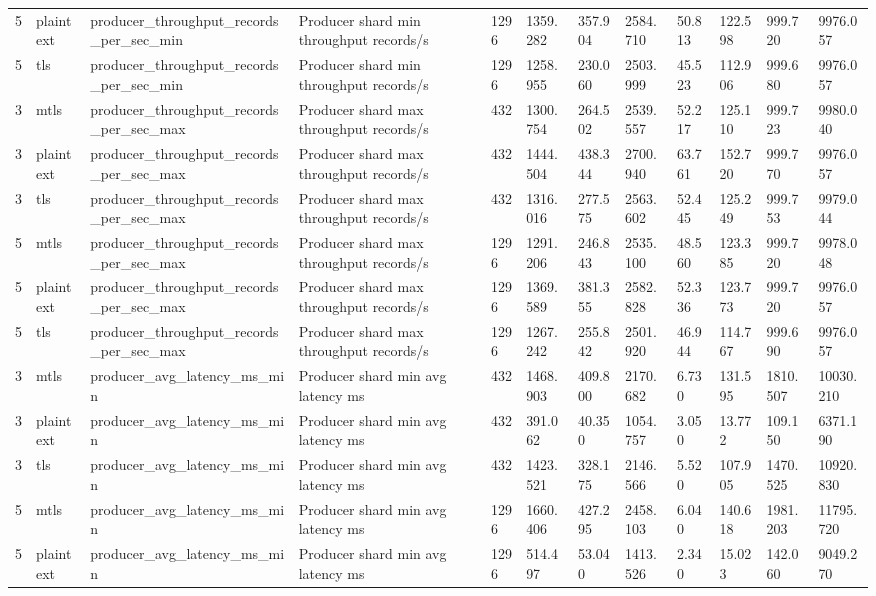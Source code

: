 \begin{longtable}{llllllllllll}
5 & plaintext & producer\_throughput\_records\_per\_sec\_min & Producer shard min throughput records/s & 1296 & 1359.282 & 357.904 & 2584.710 & 50.813 & 122.598 & 999.720 & 9976.057 \\
5 & tls & producer\_throughput\_records\_per\_sec\_min & Producer shard min throughput records/s & 1296 & 1258.955 & 230.060 & 2503.999 & 45.523 & 112.906 & 999.680 & 9976.057 \\
3 & mtls & producer\_throughput\_records\_per\_sec\_max & Producer shard max throughput records/s & 432 & 1300.754 & 264.502 & 2539.557 & 52.217 & 125.110 & 999.723 & 9980.040 \\
3 & plaintext & producer\_throughput\_records\_per\_sec\_max & Producer shard max throughput records/s & 432 & 1444.504 & 438.344 & 2700.940 & 63.761 & 152.720 & 999.770 & 9976.057 \\
3 & tls & producer\_throughput\_records\_per\_sec\_max & Producer shard max throughput records/s & 432 & 1316.016 & 277.575 & 2563.602 & 52.445 & 125.249 & 999.753 & 9979.044 \\
5 & mtls & producer\_throughput\_records\_per\_sec\_max & Producer shard max throughput records/s & 1296 & 1291.206 & 246.843 & 2535.100 & 48.560 & 123.385 & 999.720 & 9978.048 \\
5 & plaintext & producer\_throughput\_records\_per\_sec\_max & Producer shard max throughput records/s & 1296 & 1369.589 & 381.355 & 2582.828 & 52.336 & 123.773 & 999.720 & 9976.057 \\
5 & tls & producer\_throughput\_records\_per\_sec\_max & Producer shard max throughput records/s & 1296 & 1267.242 & 255.842 & 2501.920 & 46.944 & 114.767 & 999.690 & 9976.057 \\
3 & mtls & producer\_avg\_latency\_ms\_min & Producer shard min avg latency ms & 432 & 1468.903 & 409.800 & 2170.682 & 6.730 & 131.595 & 1810.507 & 10030.210 \\
3 & plaintext & producer\_avg\_latency\_ms\_min & Producer shard min avg latency ms & 432 & 391.062 & 40.350 & 1054.757 & 3.050 & 13.772 & 109.150 & 6371.190 \\
3 & tls & producer\_avg\_latency\_ms\_min & Producer shard min avg latency ms & 432 & 1423.521 & 328.175 & 2146.566 & 5.520 & 107.905 & 1470.525 & 10920.830 \\
5 & mtls & producer\_avg\_latency\_ms\_min & Producer shard min avg latency ms & 1296 & 1660.406 & 427.295 & 2458.103 & 6.040 & 140.618 & 1981.203 & 11795.720 \\
5 & plaintext & producer\_avg\_latency\_ms\_min & Producer shard min avg latency ms & 1296 & 514.497 & 53.040 & 1413.526 & 2.340 & 15.023 & 142.060 & 9049.270 \\

\end{longtable}
